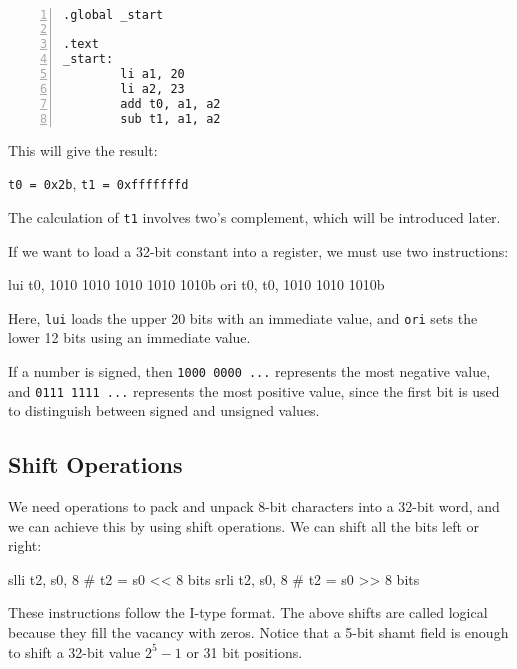 \begin{eg}~

\begin{minipage}{0.5\textwidth}
\begin{Verbatim}[numbers=left,xleftmargin=5mm]
.global _start

.text
_start:
        li a1, 20
        li a2, 23
        add t0, a1, a2
        sub t1, a1, a2
\end{Verbatim}
\end{minipage}
\begin{minipage}{0.5\textwidth}\color{red}
This will give the result: 

\verb|t0 = 0x2b|, \verb|t1 = 0xfffffffd|
\end{minipage}
\begin{note}
  The calculation of \verb|t1| involves two's complement, which will be introduced later.
\end{note}
\end{eg}

If we want to load a 32-bit constant into a register, we must use two instructions:
\begin{codeBlock}
  lui t0, 1010 1010 1010 1010 1010b
  ori t0, t0, 1010 1010 1010b
\end{codeBlock}

Here, \verb|lui| loads the upper 20 bits with an immediate value, and \verb|ori| sets the lower 12 bits using an immediate value.

If a number is signed, then \verb|1000 0000 ...| represents the most negative value, and \verb|0111 1111 ...| represents the most positive value, since the first bit is used to distinguish between signed and unsigned values.

\subsection{Shift Operations}
We need operations to pack and unpack 8-bit characters into a 32-bit word, and we can achieve this by using shift operations. We can shift all the bits left or right:
\begin{codeBlock}
  slli t2, s0, 8   # t2 = s0 << 8 bits
  srli t2, s0, 8   # t2 = s0 >> 8 bits
\end{codeBlock}

These instructions follow the I-type format. The above shifts are called logical because they fill the vacancy with zeros. Notice that a 5-bit shamt field is enough to shift a 32-bit value  \(2^5 - 1\) or 31 bit positions. 

